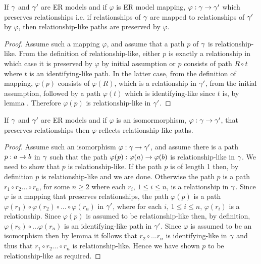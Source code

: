 \begin{lemma}
If $\gamma$ and $\gamma'$ are ER models and  if  $\varphi$ is ER model mapping, $\varphi: \gamma \rightarrow \gamma'$  which preserves relationships  i.e. if relationships of $\gamma$ are mapped to relationships of $\gamma'$ by  $\varphi$, then relationship-like paths are preserved by $\varphi$.
\end{lemma}
\begin{proof}
Assume such a mapping $\varphi$, and assume that a path $p$ of $\gamma$ is relationship-like.
From the definition of relationship-like, either $p$ is exactly a relationship in which case it is preserved by $\varphi$ by initial assumption or $p$ consists of path $R \circ t$ where $t$ is an identifying-like path.
In the latter case, from the definition of mapping, $\varphi(p)$ consists of $\varphi(R)$, which is a relationship in $\gamma'$, from the initial assumption, followed by a path $\varphi(t)$ which is identifying-like since $t$ is, by lemma . Therefore $\varphi(p)$ is relationship-like in $\gamma'$.
\end{proof}


\begin{lemma}
If $\gamma$ and $\gamma'$ are ER models and  if  $\varphi$ is an isomormorphism, $\varphi: \gamma \rightarrow \gamma'$, that preserves relationships    
then $\varphi$ reflects relationship-like paths. 
\end{lemma}
\begin{proof}
Assume such an isomorphism $\varphi: \gamma \rightarrow \gamma'$, and assume there is a path $p: a \rightarrow b$ in $\gamma$ such that the path $\varphi(p): \varphi(a) \rightarrow \varphi(b)$
is  relationship-like in $\gamma$. We need to show that $p$ is relationship-like. If the path $p$ is of length 1 then, by definition $p$ is relationship-like and we are done.
Otherwise the path $p$ is a path $r_1 \circ r_2 ... \circ r_n$, for some $n \geq 2$ where each $r_i$, $1 \leq i \leq n$, is a relationship in $\gamma$.
Since $\varphi$ is a mapping that preserves relationships, the path $\varphi(p)$ is a path $\varphi(r_1) \circ \varphi(r_2) \circ ... \circ \varphi(r_n)$ in $\gamma'$, where for each $i$, $1 \leq i \leq n$, $\varphi(r_i)$ is a relationship. Since $\varphi(p)$ is assumed to be relationship-like then, by definition, $\varphi(r_2) \circ ... \varphi(r_n)$ is an identifying-like path in $\gamma'$.
Since $\varphi$ is assumed to be an isomorphism then by lemma  it follows that $r_2 \circ ... r_n$ is identifying-like in $\gamma$ and 
thus that $r_1 \circ r_2 ... \circ r_n$ is relationship-like. Hence we have shown $p$ to be relationship-like as required.
\end{proof}


